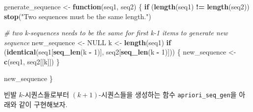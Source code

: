 \documentclass[]{book}
\newenvironment{Shaded}{\begin{snugshade}}{\end{snugshade}}
\newcommand{\CommentTok}[1]{\textcolor[rgb]{0.56,0.35,0.01}{\textit{#1}}}
\newcommand{\ControlFlowTok}[1]{\textcolor[rgb]{0.13,0.29,0.53}{\textbf{#1}}}
\newcommand{\DecValTok}[1]{\textcolor[rgb]{0.00,0.00,0.81}{#1}}
\newcommand{\KeywordTok}[1]{\textcolor[rgb]{0.13,0.29,0.53}{\textbf{#1}}}
\newcommand{\NormalTok}[1]{#1}
\newcommand{\OperatorTok}[1]{\textcolor[rgb]{0.81,0.36,0.00}{\textbf{#1}}}
\newcommand{\OtherTok}[1]{\textcolor[rgb]{0.56,0.35,0.01}{#1}}
\newcommand{\StringTok}[1]{\textcolor[rgb]{0.31,0.60,0.02}{#1}}
\begin{document}
\begin{Shaded}
\begin{Highlighting}[]
\NormalTok{generate_sequence <-}\StringTok{ }\ControlFlowTok{function}\NormalTok{(seq1, seq2) \{}
  \ControlFlowTok{if}\NormalTok{ (}\KeywordTok{length}\NormalTok{(seq1) }\OperatorTok{!=}\StringTok{ }\KeywordTok{length}\NormalTok{(seq2)) }\KeywordTok{stop}\NormalTok{(}\StringTok{"Two sequences must be the same length."}\NormalTok{)}
  
  \CommentTok{# two k-sequences needs to be the same for first k-1 items to generate new sequence}
\NormalTok{  new_sequence <-}\StringTok{ }\OtherTok{NULL}
\NormalTok{  k <-}\StringTok{ }\KeywordTok{length}\NormalTok{(seq1)}
  \ControlFlowTok{if}\NormalTok{ (}\KeywordTok{identical}\NormalTok{(seq1[}\KeywordTok{seq_len}\NormalTok{(k }\OperatorTok{-}\StringTok{ }\DecValTok{1}\NormalTok{)], seq2[}\KeywordTok{seq_len}\NormalTok{(k }\OperatorTok{-}\StringTok{ }\DecValTok{1}\NormalTok{)])) \{}
\NormalTok{    new_sequence <-}\StringTok{ }\KeywordTok{c}\NormalTok{(seq1, seq2[[k]])}
\NormalTok{  \}}
  
\NormalTok{  new_sequence}
\NormalTok{\}}
\end{Highlighting}
\end{Shaded}

빈발 \(k\)-시퀀스들로부터 \((k+1)\)-시퀀스들을 생성하는 함수 \texttt{apriori\_seq\_gen}을 아래와 같이 구현해보자.
\end{document}
